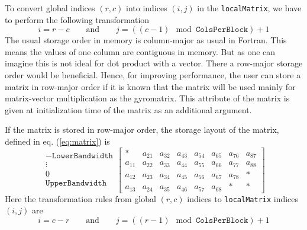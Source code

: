 To convert global indices $(r,c)$ into indices $(i,j)$ in the
\texttt{localMatrix}, we have to perform the following transformation
\begin{displaymath}
  i=r-c\qquad\mbox{and}\qquad j=((c-1)\mod\mathtt{ColsPerBlock})+1
\end{displaymath}
The usual storage order in memory is column-major as usual in
Fortran. This means the values of one column are contiguous in
memory. But as one can imagine this is not ideal for dot product with
a vector. There a row-major storage order would be beneficial. Hence,
for improving performance, the user can store a matrix in row-major
order if it is known that the matrix will be used mainly for
matrix-vector multiplication as the gyromatrix. This attribute of the
matrix is given at initialization time of the matrix as an additional
argument.

If the matrix is stored in row-major order, the storage layout of the
matrix, defined in eq. (\ref{eq:matrix}) is
\begin{displaymath}
  \begin{array}{c}
    -\mathtt{LowerBandwidth}\\
    \vdots\\
    0\\
    \mathtt{UpperBandwidth}
  \end{array}
\left[
  \begin{array}{cccc|cccc}
    *     & a_{21} & a_{32} & a_{43} & a_{54} & a_{65} & a_{76} & a_{87}\\
    a_{11} & a_{22} & a_{33} & a_{44} & a_{55} & a_{66} & a_{77} & a_{88}\\
    a_{12} & a_{23} & a_{34} & a_{45} & a_{56} & a_{67} & a_{78} & *\\
    a_{13} & a_{24} & a_{35} & a_{46} & a_{57} & a_{68} & * & *
  \end{array}
\right]
\end{displaymath}
Here the transformation rules from global $(r,c)$ indices to
\texttt{localMatrix} indices $(i,j)$ are
\begin{displaymath}
  i=c-r\qquad\mbox{and}\qquad j=((r-1)\mod\mathtt{ColsPerBlock})+1
\end{displaymath}



